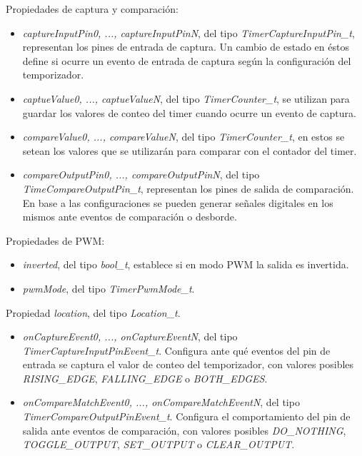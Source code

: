 Propiedades de captura y comparación:

\begin{itemize}
\item
\emph{captureInputPin0, ..., captureInputPinN}, del tipo \emph{TimerCaptureInputPin\_t}, representan los pines de entrada de captura. Un cambio de estado en éstos define si ocurre un evento de entrada de captura según la configuración del temporizador.
\item
\emph{captueValue0, ..., captueValueN}, del tipo \emph{TimerCounter\_t}, se utilizan para guardar los valores de conteo del timer cuando ocurre un evento de captura.
\item
\emph{compareValue0, ..., compareValueN}, del tipo \emph{TimerCounter\_t}, en estos se setean los valores que se utilizarán para comparar con el contador del timer.
\item
\emph{compareOutputPin0, ..., compareOutputPinN}, del tipo \emph{TimeCompareOutputPin\_t}, representan los pines de salida de comparación. En base a las configuraciones se pueden generar señales digitales en los mismos ante eventos de comparación o desborde.
\end{itemize}

Propiedades de PWM:

\begin{itemize}
\item
\emph{inverted}, del tipo \emph{bool\_t}, establece si en modo PWM la salida es invertida.
\item
\emph{pwmMode}, del tipo \emph{\emph{TimerPwmMode\_t}}.
\end{itemize}

Propiedad \emph{location}, del tipo \emph{Location\_t}.


\begin{itemize}
\item
\emph{onCaptureEvent0, ..., onCaptureEventN}, del tipo \emph{TimerCaptureInputPinEvent\_t}. Configura ante qué eventos del pin de entrada se captura el valor de conteo del temporizador, con valores posibles \emph{RISING\_EDGE}, \emph{FALLING\_EDGE} o \emph{BOTH\_EDGES}. 
\end{itemize}


\begin{itemize}
\item
\emph{onCompareMatchEvent0, ..., onCompareMatchEventN}, del tipo \emph{TimerCompareOutputPinEvent\_t}. Configura el comportamiento del pin de salida ante eventos de comparación, con valores posibles \emph{DO\_NOTHING}, \emph{TOGGLE\_OUTPUT}, \emph{SET\_OUTPUT} o \emph{CLEAR\_OUTPUT}.
\end{itemize}

